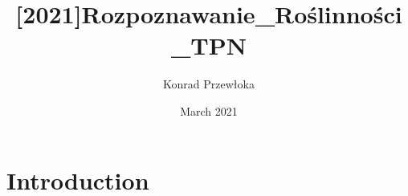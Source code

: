 \documentclass{article}
\title{[2021]Rozpoznawanie_Roślinności_TPN}
\author{Konrad Przewłoka}
\date{March 2021}
\begin{document}
\maketitle

\section{Introduction}
\end{document}
